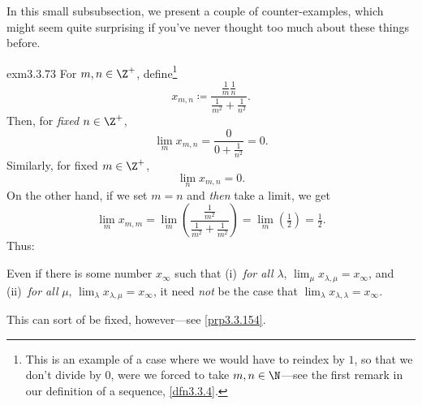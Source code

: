 In this small subsubsection, we present a couple of counter-examples, which might seem quite surprising if you've never thought too much about these things before.
\begin{exm}{}{exm3.3.73}
For $m,n\in \Z ^+$, define\footnote{This is an example of a case where we would have to reindex by $1$, so that we don't divide by $0$, were we forced to take $m,n\in \N$---see the first remark in our definition of a sequence, \cref{dfn3.3.4}.}
\begin{equation}
x_{m,n}\coloneqq \frac{\tfrac{1}{m}\tfrac{1}{n}}{\tfrac{1}{m^2}+\tfrac{1}{n^2}}.
\end{equation}
Then, for \emph{fixed} $n\in \Z ^+$,
\begin{equation}
\lim _mx_{m,n}=\frac{0}{0+\tfrac{1}{n^2}}=0.
\end{equation}
Similarly, for fixed $m\in \Z ^+$,
\begin{equation}
\lim _nx_{m,n}=0.
\end{equation}
On the other hand, if we set $m=n$ and \emph{then} take a limit, we get
\begin{equation}
\lim _mx_{m,m}=\lim _m\left( \frac{\tfrac{1}{m^2}}{\tfrac{1}{m^2}+\tfrac{1}{m^2}}\right) =\lim _m(\tfrac{1}{2})=\tfrac{1}{2}.
\end{equation}
Thus:
\begin{important}
Even if there is some number $x_\infty$ such that (i)~\emph{for all} $\lambda$, $\lim _\mu x_{\lambda ,\mu}=x_\infty$, and (ii)~\emph{for all} $\mu$, $\lim _\lambda x_{\lambda ,\mu}=x_\infty$, it need \emph{not} be the case that $\lim _\lambda x_{\lambda ,\lambda}=x_\infty$.
\end{important}
This can sort of be fixed, however---see \cref{prp3.3.154}.
\end{exm}
